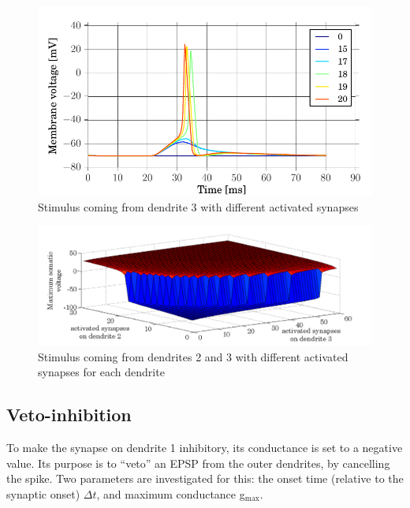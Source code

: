 \documentclass[a4paper, 10pt, conference]{ieeeconf}      %
\begin{document}
\begin{figure}
\begin{center}
\includegraphics[width=\columnwidth]{../figures/2_1-dend3_synapse_number.pdf}
\end{center}

\caption{Stimulus coming from dendrite 3 with different activated synapses}
\label{fig:2_1_2}
\end{figure}

\begin{figure}
\begin{center}
\includegraphics[width=\columnwidth]{../figures/2_2.png}
\end{center}

\caption{Stimulus coming from dendrites 2 and 3 with different activated synapses for each dendrite}
\label{fig:2_1_3}
\end{figure}

\subsection{Veto-inhibition} \label{sec:veto}
To make the synapse on dendrite 1 inhibitory, its conductance is set to a negative value. Its purpose is to “veto” an EPSP from the outer dendrites, by cancelling the spike. Two parameters are investigated for this: the onset time (relative to the synaptic onset) $\Delta t$, and maximum conductance g$_\text{max}$. 
\end{document}
